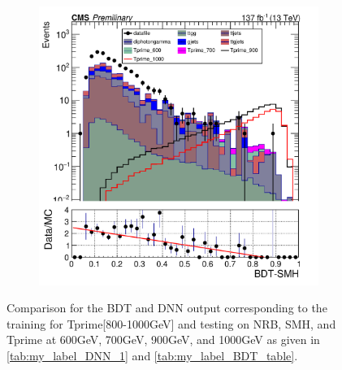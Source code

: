 \begin{figure}[H]
\begin{subfigure}[b]{0.47\textwidth}
         \includegraphics[width=\textwidth]{BDT_Output/Stacked_plot_BDT_800-1000_with_diphoton_cuts_inputs.pdf}
         \label{fig:three sin x}
     \end{subfigure}
     \label{fig:Comaprision_2}
     \caption{Comparison for the BDT and DNN output corresponding to the training for Tprime[800-1000GeV] and testing on NRB, SMH, and Tprime at 600GeV, 700GeV, 900GeV, and 1000GeV as given in \autoref{tab:my_label_DNN_1} and \autoref{tab:my_label_BDT_table}.}
\end{figure}




